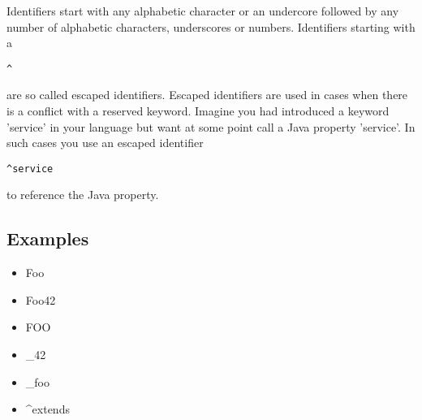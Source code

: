 \documentclass[a4paper,10pt]{scrreprt}
\newlength{\itemindentlen}
\begin{document}
Identifiers start with any alphabetic character or an undercore followed by any number of alphabetic characters, underscores or numbers. Identifiers starting with a 
\begin{lstlisting}
^
\end{lstlisting}
 are
so called escaped identifiers. Escaped identifiers are used in cases when there is a conflict with a reserved keyword. Imagine you had introduced
a keyword 'service' in your language but want at some point call a Java property 'service'. In such cases you use an escaped identifier 
\begin{lstlisting}
^service
\end{lstlisting}
 to reference the Java property.




\subsection{ Examples }


\setlength{\itemindentlen}{\textwidth}
\begin{itemize}
\addtolength{\itemindentlen}{-2em}

\item \begin{minipage}[t]{\itemindentlen}
Foo
\end{minipage}

\item \begin{minipage}[t]{\itemindentlen}
Foo42
\end{minipage}

\item \begin{minipage}[t]{\itemindentlen}
FOO
\end{minipage}

\item \begin{minipage}[t]{\itemindentlen}
\_42
\end{minipage}

\item \begin{minipage}[t]{\itemindentlen}
\_foo
\end{minipage}

\item \begin{minipage}[t]{\itemindentlen}
\textasciicircum{}extends
\end{minipage}

\end{itemize}
\addtolength{\itemindentlen}{2em}
\end{document}
